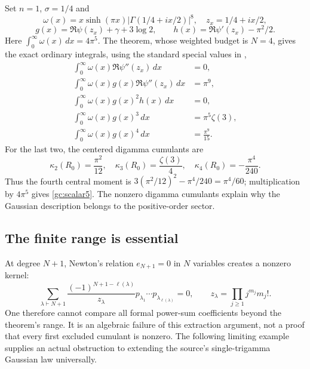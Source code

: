Set $n=1$, $\sigma=1/4$ and
\[
 \omega(x)=x\sinh(\pi x)|\Gamma(1/4+ix/2)|^8,
 \quad z_x=1/4+ix/2,
\]
\[
 g(x)=\Re\psi(z_x)+\gamma+3\log2,\qquad
 h(x)=\Re\psi'(z_x)-\pi^2/2.
\]
Here $\int_0^\infty\omega(x)\,dx=4\pi^5$.
The theorem, whose weighted budget is $N=4$, gives the exact ordinary
integrals, using the standard special values in \cite[\S5.15]{DLMF},
\begin{align}
 \int_0^\infty\omega(x)\Re\psi''(z_x)\,dx&=0,
                                                    \label{gc:scalar1}\\
 \int_0^\infty\omega(x)g(x)\Re\psi''(z_x)\,dx&=\pi^9,
                                                    \label{gc:scalar2}\\
 \int_0^\infty\omega(x)g(x)^2h(x)\,dx&=0,
                                                    \label{gc:scalar3}\\
 \int_0^\infty\omega(x)g(x)^3\,dx&=\pi^5\zeta(3),
                                                    \label{gc:scalar4}\\
 \int_0^\infty\omega(x)g(x)^4\,dx&=\frac{\pi^9}{15}.
                                                    \label{gc:scalar5}
\end{align}
For the last two, the centered digamma cumulants are
\[
 \kappa_2(R_0)=\frac{\pi^2}{12},\quad
 \kappa_3(R_0)=\frac{\zeta(3)}4,\quad
 \kappa_4(R_0)=-\frac{\pi^4}{240}.
\]
Thus the fourth central moment is
$3(\pi^2/12)^2-\pi^4/240=\pi^4/60$; multiplication by
$4\pi^5$ gives \eqref{gc:scalar5}.
The nonzero digamma cumulants explain why the Gaussian description
belongs to the positive-order sector.

\subsection{The finite range is essential}

At degree $N+1$, Newton's relation $e_{N+1}=0$ in $N$ variables creates
a nonzero kernel:
\begin{equation}\label{gc:firstrelation}
 \sum_{\lambda\vdash N+1}
       \frac{(-1)^{N+1-\ell(\lambda)}}{z_\lambda}
                 p_{\lambda_1}\cdots p_{\lambda_{\ell(\lambda)}}=0,
 \qquad z_\lambda=\prod_{j\ge1}j^{m_j}m_j!.
\end{equation}
One therefore cannot compare all formal power-sum coefficients beyond
the theorem's range. It is an algebraic failure of this extraction
argument, not a proof that every first excluded cumulant is nonzero.
The following limiting example supplies an actual obstruction to
extending the source's single-trigamma Gaussian law universally.

